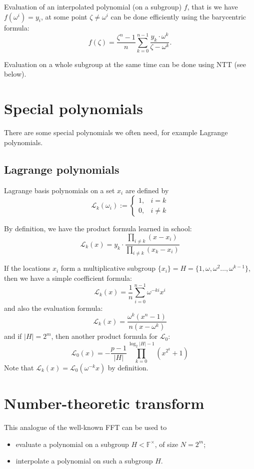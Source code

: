 \documentclass[12pt,draft,a4paper,openany,oneside]{amsbook}
\def\calL{\mathcal{L}}
\def\F{\mathbb{F}}
\theoremstyle{plain}
\theoremstyle{definition}
\begin{document}
Evaluation of an interpolated polynomial (on a subgroup) $f$, that is we have
$f(\omega^i)=y_i$, at some point $\zeta\neq \omega^i$ can be done efficiently using 
the barycentric formula:
\[ f(\zeta) = \frac{\zeta^n - 1}{n} \sum_{k=0}^{n-1} \frac{y_k\cdot\omega^k}{\zeta - \omega^k} . 
\]
$\;$

Evaluation on a whole subgroup at the same time can be done using NTT (see below).

\section{Special polynomials}

There are some special polynomials we often need, for example Lagrange polynomials.

\subsection{Lagrange polynomials}

Lagrange basis polynomials on a set $x_i$ are defined by
\[ \calL_k(\omega_i) := \left\{\begin{array}{ll}
1, & i=    k \\
0, & i\neq k
\end{array}\right.
\] 

By definition, we have the product formula learned in school:
\[ \calL_k(x) = y_k \cdot \frac{ \prod_{i\neq k} (x-x_i) } { \prod_{i\neq k} (x_k-x_i) }
\]

If the locations $x_i$ form a multiplicative subgroup $\{x_i\}=H=\{1,\omega,\omega^2\dots,\omega^{k-1}\}$,
then we have a simple coefficient formula:
\[ \calL_k(x) = \frac{1}{n} \sum_{i=0}^{n-1} \omega^{-ki}x^i
\]
and also the evaluation formula:
\[ 
\calL_k(x) = \frac{\omega^k (x^n - 1)}{n(x- \omega^k)} 
\]
and if $|H|=2^m$, then another product formula for $\calL_0$:
\[
\calL_0(x) = - \frac{p-1}{|H|}\prod_{k=0}^{\log_2|H|-1} (x^{2^k} + 1)
\] 
Note that $\calL_k(x) = \calL_0(\omega^{-k}x)$ by definition.


\section{Number-theoretic transform}

This analogue of the well-known FFT can be used to 
\begin{itemize} 
\item evaluate a polynomial on a subgroup $H<\F^\times$, of size $N=2^m$;
\item interpolate a polynomial on such a subgroup $H$.
\end{itemize}
\end{document}
